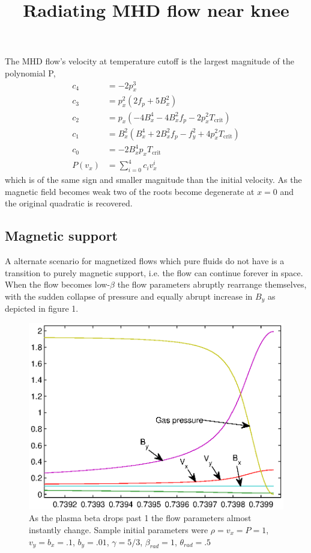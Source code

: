 \documentclass[letterpaper,12pt,twocolumn]{article}
\begin{document}
The MHD flow's velocity at temperature cutoff is the largest magnitude of the polynomial P,
\begin{eqnarray}
c_4 &= -2 p_x^3 \\
c_3 &= p_x^2 (2 f_p + 5 B_x^2) \\
c_2 &= p_x (-4 B_x^4 - 4 B_x^2 f_p - 2 p_x^2 T_\text{crit}) \\
c_1 &= B_x^2 (B_x^4 + 2 B_x^2 f_p - f_y^2 + 4 p_x^2 T_\text{crit}) \\
c_0 &= -2 B_x^4 p_x T_\text{crit} \\
P(v_x) &= \displaystyle\sum_{i=0}^4 c_i v_x^i 
\end{eqnarray}
which is of the same sign and smaller magnitude than the initial velocity. As the magnetic
field becomes weak two of the roots become degenerate at $x=0$ and the original
quadratic is recovered.

\subsection{Magnetic support}

A alternate scenario for magnetized flows which pure fluids do not have is a
transition to purely magnetic support, i.e. the flow can continue forever in space. When
the flow becomes low-$\beta$ the flow parameters abruptly rearrange themselves,
with the sudden collapse of pressure and equally abrupt increase in $B_y$ as
depicted in figure 1. 

\begin{figure}
\title{Radiating MHD flow near knee}
\centering \includegraphics{bsupport}
\caption{As the plasma beta drops past 1 the flow parameters almost instantly
change. Sample initial parameters were $\rho = v_x = P = 1$, $v_y = b_x = .1$, $b_y = .01$, $\gamma=5/3$, $\beta_{rad} = 1$, $\theta_{rad} = .5$ } \label{kneefig}
\end{figure}
\end{document}
